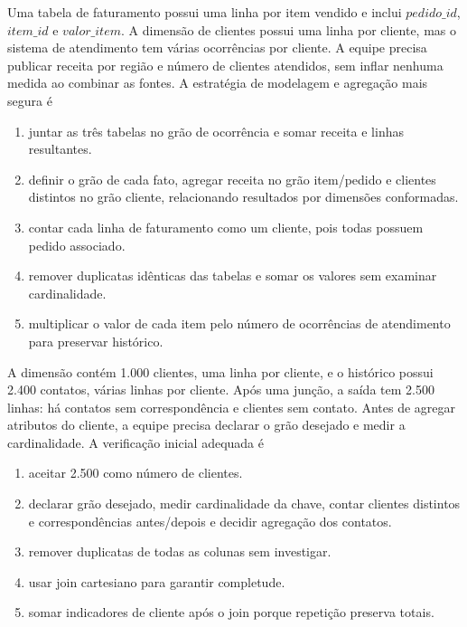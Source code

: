 \TextoBase Uma tabela de faturamento possui uma linha por item vendido e inclui $pedido\_id$, $item\_id$ e $valor\_item$. A dimensão de clientes possui uma linha por cliente, mas o sistema de atendimento tem várias ocorrências por cliente. A equipe precisa publicar receita por região e número de clientes atendidos, sem inflar nenhuma medida ao combinar as fontes.
\FonteDidatica
\Comando A estratégia de modelagem e agregação mais segura é
\begin{enumerate}[label=\Alph*)]
\item juntar as três tabelas no grão de ocorrência e somar receita e linhas resultantes.
\item definir o grão de cada fato, agregar receita no grão item/pedido e clientes distintos no grão cliente, relacionando resultados por dimensões conformadas.
\item contar cada linha de faturamento como um cliente, pois todas possuem pedido associado.
\item remover duplicatas idênticas das tabelas e somar os valores sem examinar cardinalidade.
\item multiplicar o valor de cada item pelo número de ocorrências de atendimento para preservar histórico.
\end{enumerate}
\TextoBase A dimensão contém 1.000 clientes, uma linha por cliente, e o histórico possui 2.400 contatos, várias linhas por cliente. Após uma junção, a saída tem 2.500 linhas: há contatos sem correspondência e clientes sem contato. Antes de agregar atributos do cliente, a equipe precisa declarar o grão desejado e medir a cardinalidade.
\FonteDidatica
\Comando A verificação inicial adequada é
\begin{enumerate}[label=\Alph*)]\item aceitar 2.500 como número de clientes.\item declarar grão desejado, medir cardinalidade da chave, contar clientes distintos e correspondências antes/depois e decidir agregação dos contatos.\item remover duplicatas de todas as colunas sem investigar.\item usar join cartesiano para garantir completude.\item somar indicadores de cliente após o join porque repetição preserva totais.\end{enumerate}

